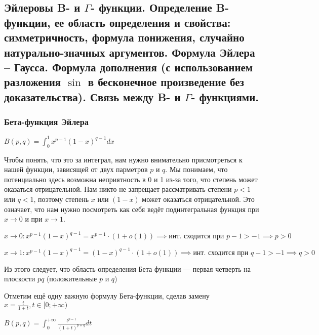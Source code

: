 \subsection{Эйлеровы B- и $\Gamma$- функции. Определение B-функции, ее область определения и свойства: симметричность, формула понижения, случайно натурально-значных аргументов. Формула Эйлера -- Гаусса. Формула дополнения (с использованием разложения $\sin$ в бесконечное произведение без доказательства). Связь между B- и $\Gamma$- функциями.}

\subsubsection{Бета-функция Эйлера}
\(
B(p, q) = \int_0^1 x^{p-1}(1 - x)^{q-1}dx
\)

Чтобы понять, что это за интеграл, нам нужно внимательно присмотреться
к нашей функции, зависящей от двух парметров $p$ и $q$. Мы понимаем, что потенциально
здесь возможна неприятность в 0 и 1 из-за того, что степень может оказаться отрицательной.
Нам никто не запрещает рассматривать степени $p < 1$ или $q < 1$, поэтому степень
$x$ или $(1 - x)$ может оказаться отрицательной. Это означает, что нам нужно
посмотреть как себя ведёт подинтегральная функция при $x \to 0$ и при $x \to 1$.

\(
x \to 0: x^{p-1}(1-x)^{q - 1} = x^{p-1} \cdot (1 + o(1)) \implies
\text{инт. сходится при } p-1 > -1 \implies p > 0
\)

\(
x \to 1: x^{p-1}(1-x)^{q - 1} = (1 - x)^{q-1} \cdot (1 + o(1)) \implies
\text{инт. сходится при } q-1 > -1 \implies q > 0
\)

Из этого следует, что область определения Бета функции --- первая четверть на плоскости $pq$
(положительные $p$ и $q$)

Отметим ещё одну важную формулу Бета-функции, сделав замену
\(
x = \frac{t}{1 + t}, t \in [0; +\infty)
\)

\(
B(p, q) = \int_0^{+\infty}\frac{t^{p-1}}{(1 + t)^{p + q}}dt
\)

